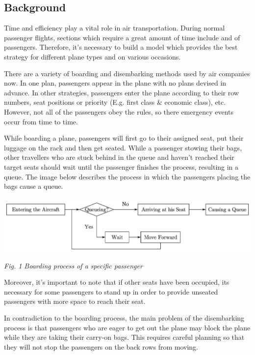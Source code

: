 \documentclass{article}
\theoremstyle{definition}
\theoremstyle{remark}
\numberwithin{equation}{section}
\begin{document}
	\subsection{Background}
	Time and efficiency play a vital role in air transportation. During normal passenger flights, sections which require a great amount of time include  and  of passengers. Therefore, it's necessary to build a model which provides the best strategy for different plane types and on various occasions.

	There are a variety of boarding and disembarking methods used by air companies now. In one plan, passengers appear in the plane with no plans devised in advance. In other strategies, passengers enter the plane according to their row numbers, seat positions or priority (E.g. first class \& economic class), etc. However, not all of the passengers obey the rules, so there emergency events occur from time to time.

	While boarding a plane, passengers will first go to their assigned seat, put their luggage on the rack and then get seated. While a passenger stowing their bags, other travellers who are stuck behind in the queue and haven't reached their target seats should wait until the passenger finishes the process, resulting in a queue. The image below describes the process in which the passengers placing the bags cause a queue.


	\begin{center}
		\includegraphics[width=14cm]{chart.jpg}

		\textit{Fig. 1 Boarding process of a specific passenger}
	\end{center}

	Moreover, it's important to note that if other seats have been occupied, its necessary for some passengers to stand up in order to provide unseated passengers with more space to reach their seat.

	In contradiction to the boarding process, the main problem of the disembarking process is that passengers who are eager to get out the plane may block the plane while they are taking their carry-on bags. This requires careful planning so that they will not stop the passengers on the back rows from moving.
\end{document}
